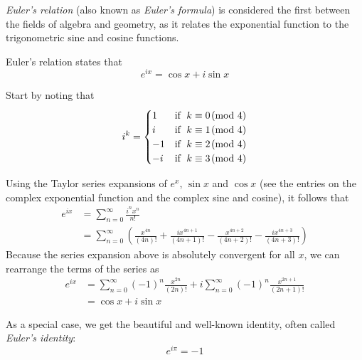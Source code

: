 \documentclass[12pt]{article}
\begin{document}
{\em Euler's relation} (also known as {\em Euler's formula}) is considered the first  between the fields of algebra and geometry, as it relates the exponential function to the trigonometric sine and cosine functions.

Euler's relation states that
\[e^{ix} = \cos{x}+i\sin{x}\]

Start by noting that
\[
i^k=\begin{cases} 
1 & \mbox{if\; } k\equiv 0\!\!\pmod 4\\
i & \mbox{if\; } k\equiv 1\!\!\pmod 4\\
-1 & \mbox{if\; } k\equiv 2\!\!\pmod 4\\
-i & \mbox{if\; } k\equiv 3\!\!\pmod 4
\end{cases}
\]

Using the Taylor series expansions of $e^x$, $\sin x$ and $\cos x$ (see the entries on the complex exponential function and the complex sine and cosine), it follows that
\begin{eqnarray*}
e^{ix} & = \sum_{n=0}^{\infty} \frac{i^n x^n}{n!}\\
& = \sum_{n=0}^{\infty}\left(\frac{x^{4n}}{(4n)!}+
\frac{ix^{4n+1}}{(4n+1)!}
-\frac{x^{4n+2}}{(4n+2)!}-\frac{ix^{4n+3}}{(4n+3)!}\right)
\end{eqnarray*}
Because the series expansion above is absolutely convergent for all $x$,
we can rearrange the terms of the series as
\begin{eqnarray*}
e^{ix} &=  \sum_{n=0}^{\infty} (-1)^n\frac{x^{2n}}{(2n)!}+
i\sum_{n=0}^{\infty} (-1)^n\frac{x^{2n+1}}{(2n+1)!}\\
&= \cos{x}+i\sin{x}
\end{eqnarray*}

As a special case, we get the beautiful and well-known identity, often called \emph{Euler's identity}:
\[e^{i\pi}=-1\]
\end{document}
